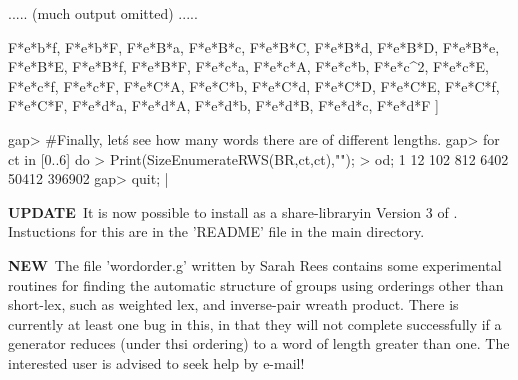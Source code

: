   .....  (much output omitted)   .....

  F*e*b*f, F*e*b*F, F*e*B*a, F*e*B*c, F*e*B*C, F*e*B*d, F*e*B*D, F*e*B*e, 
  F*e*B*E, F*e*B*f, F*e*B*F, F*e*c*a, F*e*c*A, F*e*c*b, F*e*c^2, F*e*c*E, 
  F*e*c*f, F*e*c*F, F*e*C*A, F*e*C*b, F*e*C*d, F*e*C*D, F*e*C*E, F*e*C*f, 
  F*e*C*F, F*e*d*a, F*e*d*A, F*e*d*b, F*e*d*B, F*e*d*c, F*e*d*F ]

gap> #Finally, let\'s see how many words there are of different lengths.
gap> for ct in [0..6] do
> Print(SizeEnumerateRWS(BR,ct,ct),"\n");
> od;
1
12
102
812
6402
50412
396902
gap> quit;
|

{\bf UPDATE}\:\ It is now possible to install
{\KBMAG} as a share-libraryin Version 3 of {\GAP}.
Instuctions for this are in the 'README' file in
the main {\KBMAG} directory.

{\bf NEW}\:\ The file 'wordorder.g' written by Sarah Rees contains some
experimental routines for finding the automatic structure of groups using
orderings other than short-lex, such as weighted lex, and inverse-pair
wreath product. There is currently at least one bug in this, in that
they will not complete successfully if a generator reduces (under
thsi ordering) to a word of length greater than one. The interested
user is advised to seek help by e-mail!
